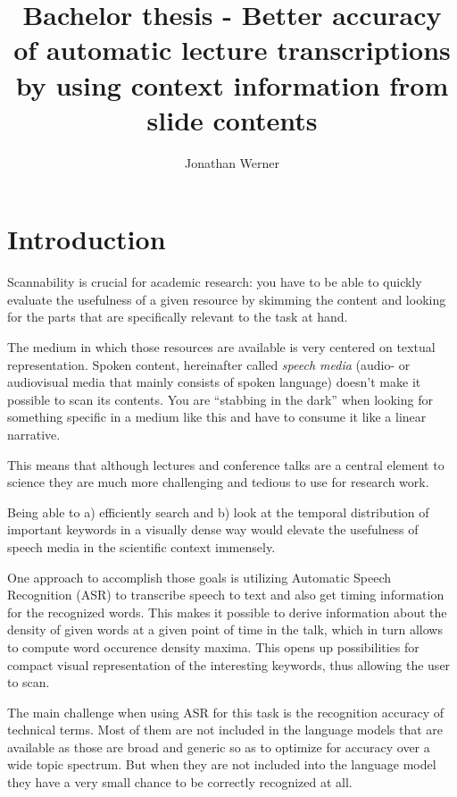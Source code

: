 \documentclass[]{article}
\title{Bachelor thesis - Better accuracy of automatic lecture transcriptions by
using context information from slide contents}
\author{Jonathan Werner}
\date{}
\begin{document}
\maketitle

{
\hypersetup{linkcolor=black}
\setcounter{tocdepth}{3}
\tableofcontents
}
\newpage

\section*{Introduction}\label{introduction}

Scannability is crucial for academic research: you have to be able to
quickly evaluate the usefulness of a given resource by skimming the
content and looking for the parts that are specifically relevant to the
task at hand.

The medium in which those resources are available is very centered on
textual representation. Spoken content, hereinafter called \emph{speech
media} (audio- or audiovisual media that mainly consists of spoken
language) doesn't make it possible to scan its contents. You are
``stabbing in the dark'' when looking for something specific in a medium
like this and have to consume it like a linear narrative.

This means that although lectures and conference talks are a central
element to science they are much more challenging and tedious to use for
research work.

Being able to a) efficiently search and b) look at the temporal
distribution of important keywords in a visually dense way would elevate
the usefulness of speech media in the scientific context immensely.

One approach to accomplish those goals is utilizing Automatic Speech
Recognition (ASR) to transcribe speech to text and also get timing
information for the recognized words. This makes it possible to derive
information about the density of given words at a given point of time in
the talk, which in turn allows to compute word occurence density maxima.
This opens up possibilities for compact visual representation of the
interesting keywords, thus allowing the user to scan.

The main challenge when using ASR for this task is the recognition
accuracy of technical terms. Most of them are not included in the
language models that are available as those are broad and generic so as
to optimize for accuracy over a wide topic spectrum. But when they are
not included into the language model they have a very small chance to be
correctly recognized at all.
\end{document}
